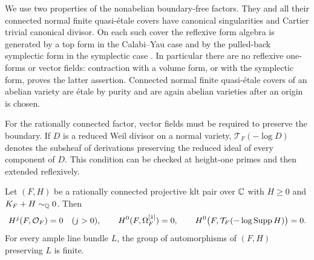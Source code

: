 We use two properties of the nonabelian boundary-free factors.  They
and all their connected normal finite quasi-\'etale covers have
canonical singularities and Cartier trivial canonical divisor.  On
each such cover the reflexive form algebra is generated by a top form
in the Calabi--Yau case and by the pulled-back symplectic form in the
symplectic case \cite[Definition~1.4]{HP}.  In particular there are no
reflexive one-forms or vector fields: contraction with a volume form,
or with the symplectic form, proves the latter assertion.  Connected
normal finite quasi-\'etale covers of an abelian variety are \'etale
by purity and are again abelian varieties after an origin is chosen.

For the rationally connected factor, vector fields must be required
to preserve the boundary.  If $D$ is a reduced Weil divisor on a
normal variety, $\mathcal T_F(-\log D)$ denotes the subsheaf of
derivations preserving the reduced ideal of every component of $D$.
This condition can be checked at height-one primes and then extended
reflexively.

\begin{lemma}
\label{lem:rc-aut}
Let $(F,H)$ be a rationally connected projective klt pair over $\mathbb C$
with $H\geq0$ and $K_F+H\sim_{\mathbb Q}0$.  Then
\[
 H^j(F,\mathcal O_F)=0\quad(j>0),\qquad
 H^0(F,\Omega_F^{[1]})=0,\qquad
 H^0\bigl(F,\mathcal T_F(-\log\operatorname{Supp} H)\bigr)=0.
\]
For every ample line bundle $L$, the group of automorphisms of
$(F,H)$ preserving $L$ is finite.
\end{lemma}

